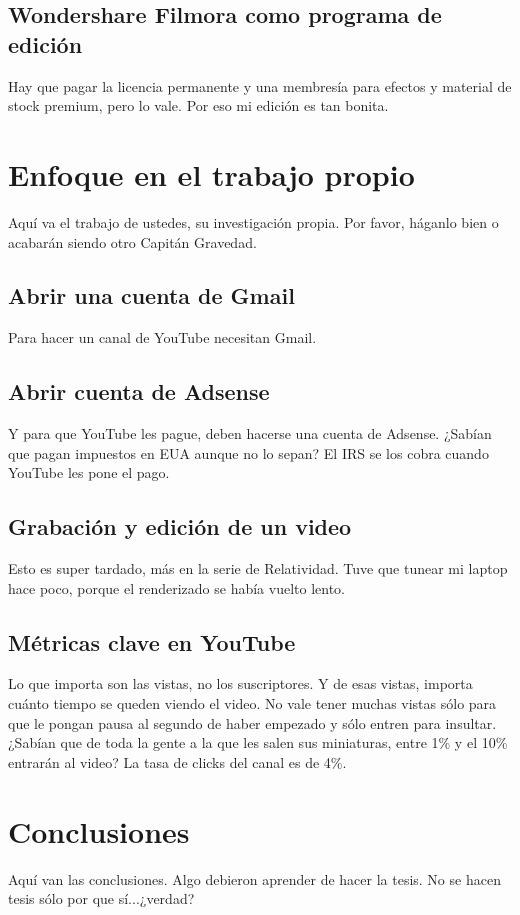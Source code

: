 \documentclass[letter,twoside,12pt]{book}
\begin{document}
\section{Wondershare Filmora como programa de edición}\label{sec:twist}
Hay que pagar la licencia permanente y una membresía para efectos y material de stock premium, pero lo vale. Por eso mi edición es tan bonita.

\chapter{Enfoque en el trabajo propio}\label{cap4}
Aquí va el trabajo de ustedes, su investigación propia. Por favor, háganlo bien o acabarán siendo otro Capitán Gravedad.
\section{Abrir una cuenta de Gmail} 
\label{sec:ecl}
Para hacer un canal de YouTube necesitan Gmail.

\section{Abrir cuenta de Adsense}
\label{sec:eci}
Y para que YouTube les pague, deben hacerse una cuenta de Adsense. ¿Sabían que pagan impuestos en EUA aunque no lo sepan? El IRS se los cobra cuando YouTube les pone el pago.

\section{Grabación y edición de un video}
\label{sec:e}
Esto es super tardado, más en la serie de Relatividad. Tuve que tunear mi laptop hace poco, porque el renderizado se había vuelto lento.

\section{Métricas clave en YouTube}
\label{sec:ev}
Lo que importa son las vistas, no los suscriptores. Y de esas vistas, importa cuánto tiempo se queden viendo el video. No vale tener muchas vistas sólo para que le pongan pausa al segundo de haber empezado y sólo entren para insultar. ¿Sabían que de toda la gente a la que les salen sus miniaturas, entre 1\% y el 10\% entrarán al video? La tasa de clicks del canal es de 4\%.

\chapter{Conclusiones}\label{cap5}
Aquí van las conclusiones. Algo debieron aprender de hacer la tesis. No se hacen tesis sólo por que sí...¿verdad?
\appendix
\end{document}
